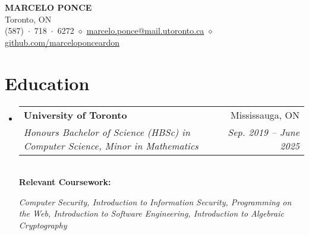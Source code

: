 \documentclass[letterpaper,11pt]{article}
\makeatletter
\newcommand{\resumeSubheading}[4]{
  \vspace{-2pt}\item
    \begin{tabular*}{0.97\textwidth}[t]{l@{\extracolsep{\fill}}r}
      \textbf{#1} & #2 \\
      \textit{\small#3} & \textit{\small #4} \\
    \end{tabular*}\vspace{-7pt}
}
\newcommand{\resumeSubHeadingListStart}{\begin{itemize}[leftmargin=0.15in, label={}]}
\newcommand{\resumeSubHeadingListEnd}{\end{itemize}}
\makeatother
\begin{document}

\begin{center}
    \textbf{\Huge \scshape MARCELO PONCE} \\ \vspace{1pt}
    \small Toronto, ON \\
    \small (587)~$\cdot$~718~$\cdot$~6272 $\diamond$ \href{mailto:marcelo.ponce@mail.utoronto.ca}{\underline{marcelo.ponce@mail.utoronto.ca}} $\diamond$
    \href{https://github.com/marceloponceardon}{\underline{github.com/marceloponceardon}}
\end{center}


\section{Education}
  \resumeSubHeadingListStart
    \resumeSubheading
      {University of Toronto}{Mississauga, ON}
      {Honours Bachelor of Science (HBSc) in Computer Science, Minor in Mathematics}{Sep. 2019 -- June 2025} \\
      \vspace{8pt}
      \textbf{Relevant Coursework:} \\
      {\it
	      Computer Security,
	      Introduction to Information Security,
	      Programming on the Web,
	      Introduction to Software Engineering,
	      Introduction to Algebraic Cryptography

      }
  \resumeSubHeadingListEnd
\end{document}
